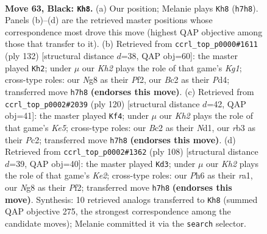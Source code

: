 \documentclass[11pt]{article}
\begin{document}
\clearpage

\begin{figure}[p]\centering
\begin{subfigure}{0.46\textwidth}\centering
\resizebox{\linewidth}{!}{%
\newchessgame
\chessboard[
  setfen={6n1/pR5k/P6p/5p2/1P3P1b/1R6/2br4/6K1 b - - 2 63},
  showmover=false,
  pgfstyle=straightmove, color=movearrow, markmove={h7-h8}
]}
\caption{}
\end{subfigure}\hfill
\begin{subfigure}{0.46\textwidth}\centering
\resizebox{\linewidth}{!}{%
\newchessgame
\chessboard[
  setfen={5k2/1R6/4pB1p/1b1p1P2/3P4/1pP5/5P2/1r4K1 w - - 0 67},
  showmover=false,
  pgfstyle=straightmove, color=movearrow, markmove={g1-h2}
]}
\caption{}
\end{subfigure}
\\[4pt]
\begin{subfigure}{0.46\textwidth}\centering
\resizebox{\linewidth}{!}{%
\newchessgame
\chessboard[
  setfen={4r3/8/8/1p2K2k/1P2N1p1/1P5p/2P3rP/3N3R w - - 36 61},
  showmover=false,
  pgfstyle=straightmove, color=movearrow, markmove={e5-f4}
]}
\caption{}
\end{subfigure}\hfill
\begin{subfigure}{0.46\textwidth}\centering
\resizebox{\linewidth}{!}{%
\newchessgame
\chessboard[
  setfen={6k1/1R6/3p3p/1p2r2P/1P3R2/8/4KP2/r7 w - - 18 55},
  showmover=false,
  pgfstyle=straightmove, color=movearrow, markmove={e2-d3}
]}
\caption{}
\end{subfigure}
\caption{\textbf{Move 63, Black: \texttt{Kh8}.} (a) Our position; Melanie plays \texttt{Kh8} (\texttt{h7h8}). Panels (b)--(d) are the retrieved master positions whose correspondence most drove this move (highest QAP objective among those that transfer to it). (b) Retrieved from \texttt{ccrl\_top\_p0000\#1611} (ply 132) [structural distance $d$=38, QAP obj=60]: the master played \texttt{Kh2}; under $\mu$ our \emph{Kh2} plays the role of that game's \emph{Kg1}; cross-type roles: our \emph{N}g8 as their \emph{P}f2, our \emph{B}c2 as their \emph{P}d4; transferred move \texttt{h7h8} \textbf{(endorses this move)}. (c) Retrieved from \texttt{ccrl\_top\_p0002\#2039} (ply 120) [structural distance $d$=42, QAP obj=41]: the master played \texttt{Kf4}; under $\mu$ our \emph{Kh2} plays the role of that game's \emph{Ke5}; cross-type roles: our \emph{B}c2 as their \emph{N}d1, our \emph{r}b3 as their \emph{P}c2; transferred move \texttt{h7h8} \textbf{(endorses this move)}. (d) Retrieved from \texttt{ccrl\_top\_p0002\#1362} (ply 108) [structural distance $d$=39, QAP obj=40]: the master played \texttt{Kd3}; under $\mu$ our \emph{Kh2} plays the role of that game's \emph{Ke2}; cross-type roles: our \emph{P}h6 as their \emph{r}a1, our \emph{N}g8 as their \emph{P}f2; transferred move \texttt{h7h8} \textbf{(endorses this move)}. Synthesis: 10 retrieved analogs transferred to \texttt{Kh8} (summed QAP objective 275, the strongest correspondence among the candidate moves); Melanie committed it via the \texttt{search} selector.}
\label{fig:thought-m125}
\end{figure}
\end{document}

